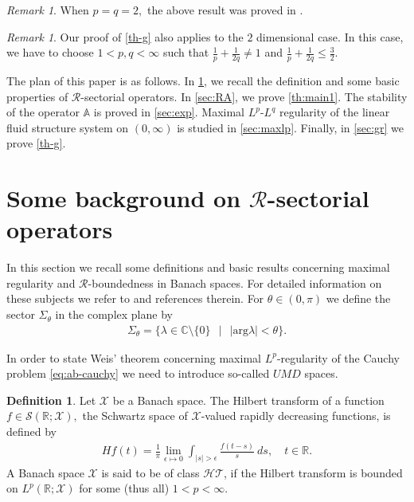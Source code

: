 \documentclass[12pt,a4paper,reqno]{amsart}
\theoremstyle{definition}
\newtheorem{definition}[theorem]{Definition}
\theoremstyle{remark}
\newtheorem{remark}[theorem]{Remark}
\numberwithin{equation}{section}
\newcommand{\ds}{\displaystyle}
\newcommand{\mx}{\mathcal{X}}
\newcommand{\mr}{\mathcal{R}}
\begin{document}
\begin{remark}
When $p =q =2,$ the above result was proved in \cite[Corollary 9.2]{TT2}.
\end{remark}

\begin{remark}
Our proof of \cref{th-g} also applies to the $2$ dimensional case.  In this case, we have to  choose $1 < p,q < \infty$ such that $\ds \frac{1}{p} + \frac{1}{2q} \neq 1$ and $\ds \frac{1}{p} + \frac{1}{2q} \leqslant \frac{3}{2}.$
\end{remark}


The plan of this paper is as follows.  In \cref{sec:R}, we recall the definition and some basic properties  of $\mr$-sectorial operators.  In \cref{sec:RA}, we prove \cref{th:main1}. The stability of the operator $\mathbb{A}$ is proved in \cref{sec:exp}. Maximal $L^{p}$-$L^{q}$ regularity of the linear fluid structure system on $(0,\infty)$
is studied in \cref{sec:maxlp}. Finally, in \cref{sec:gr}  we prove \cref{th-g}.


\section{Some background on $\mr$-sectorial operators} \label{sec:R}
In this section we recall some definitions and  basic results concerning maximal regularity and  $\mathcal{R}$-boundedness in Banach spaces. For detailed information on these subjects we refer to \cite{Weis01,KW04,DenkHieberPruss} and  references therein.  For $\theta \in (0,\pi)$ we define  the sector $\Sigma_{\theta}$ in the complex plane by
\begin{align}
\Sigma_{\theta} =  \{ \lambda \in \mathbb{C} \setminus \{0\} \ \ \mid \ \  |\mathrm{arg} \lambda| < \theta \}.
\end{align}



In order to state  Weis' theorem concerning maximal $L^{p}$-regularity of the Cauchy problem \eqref{eq:ab-cauchy} we need to introduce so-called $UMD$ spaces.

\begin{definition}
Let $\mx$ be a Banach space. The Hilbert transform of a function $f \in {\mathcal S}(\mathbb{R};\mx),$ the Schwartz space of $\mx$-valued rapidly decreasing functions, is defined by
\begin{align*}
Hf(t) = \frac{1}{\pi} \lim_{\epsilon \mapsto 0} \int_{|s| > \epsilon} \frac{f(t-s)}{s} \ ds, \quad t \in \mathbb{R}.
\end{align*}
A Banach space  $\mx$ is said to be of class ${\mathcal {HT}}$, if the Hilbert transform is bounded on $L^{p}(\mathbb{R};\mx)$ for some (thus all) $1 < p < \infty.$
\end{definition}
\end{document}

